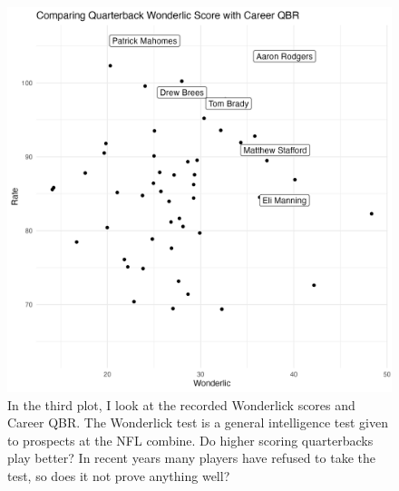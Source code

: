 \documentclass{article}
\begin{document}
\begin{figure}
    \centering
    \includegraphics{PS6c_Jones.png}
    \caption{In the third plot, I look at the recorded Wonderlick scores and Career QBR. The Wonderlick test is a general intelligence test given to prospects at the NFL combine. Do higher scoring quarterbacks play better? In recent years many players have refused to take the test, so does it not prove anything well?}
    \label{fig:my_label}
\end{figure}
\end{document}
